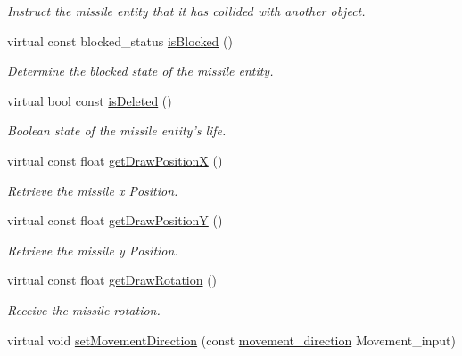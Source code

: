 \begin{DoxyCompactItemize}
\begin{DoxyCompactList}\small\item\em Instruct the missile entity that it has collided with another object. \end{DoxyCompactList}\item 
\hypertarget{class_missile_a2c86874bf5e6bde8cb97f4ed1a07c3ea}{virtual const blocked\+\_\+status \hyperlink{class_missile_a2c86874bf5e6bde8cb97f4ed1a07c3ea}{is\+Blocked} ()}\label{class_missile_a2c86874bf5e6bde8cb97f4ed1a07c3ea}

\begin{DoxyCompactList}\small\item\em Determine the blocked state of the missile entity. \end{DoxyCompactList}\item 
\hypertarget{class_missile_a96c1240f08fed605ff9e908a0bea50e4}{virtual bool const \hyperlink{class_missile_a96c1240f08fed605ff9e908a0bea50e4}{is\+Deleted} ()}\label{class_missile_a96c1240f08fed605ff9e908a0bea50e4}

\begin{DoxyCompactList}\small\item\em Boolean state of the missile entity's life. \end{DoxyCompactList}\item 
virtual const float \hyperlink{class_missile_a8e8d526d7578cfbabbd5bf1bdb9727bc}{get\+Draw\+Position\+X} ()
\begin{DoxyCompactList}\small\item\em Retrieve the missile x Position. \end{DoxyCompactList}\item 
virtual const float \hyperlink{class_missile_ad609bee2bfaf610824f32c15430fa6d8}{get\+Draw\+Position\+Y} ()
\begin{DoxyCompactList}\small\item\em Retrieve the missile y Position. \end{DoxyCompactList}\item 
virtual const float \hyperlink{class_missile_ab606b0b4f38c821063f210625f926374}{get\+Draw\+Rotation} ()
\begin{DoxyCompactList}\small\item\em Receive the missile rotation. \end{DoxyCompactList}\item 
\hypertarget{class_missile_a5bff45d0243e353acdf610fdade02bb0}{virtual void \hyperlink{class_missile_a5bff45d0243e353acdf610fdade02bb0}{set\+Movement\+Direction} (const \hyperlink{_structures_8h_a0d0b88f27f3adf9452879b5d9f829026}{movement\+\_\+direction} Movement\+\_\+input)}\label{class_missile_a5bff45d0243e353acdf610fdade02bb0}


\end{DoxyCompactItemize}
